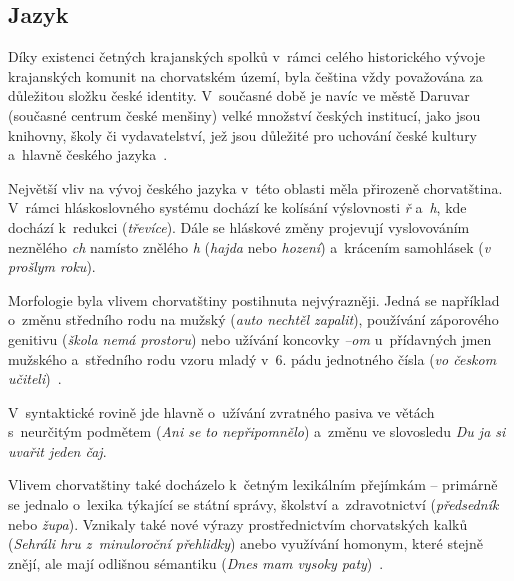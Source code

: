\hypertarget{jazyk-3}{%
\subsection*{Jazyk}\label{jazyk-3}}

Díky existenci četných krajanských spolků v~rámci celého historického vývoje krajanských komunit na chorvatském území, byla čeština vždy považována za důležitou složku české identity. V~současné době je navíc ve městě Daruvar (současné centrum české menšiny) velké množství českých institucí, jako jsou knihovny, školy či vydavatelství, jež jsou důležité pro uchování české kultury a~hlavně českého jazyka~\parencite{Veltruski2018}.

Největší vliv na vývoj českého jazyka v~této oblasti měla přirozeně chorvatština. V~rámci hláskoslovného systému dochází ke kolísání výslovnosti \emph{ř} a~\emph{h}, kde dochází k~redukci (\emph{třevíce}). Dále se hláskové změny projevují vyslovováním neznělého \emph{ch} namísto znělého \emph{h} (\emph{hajda} nebo \emph{hození}) a~krácením samohlásek (\emph{v prošlym roku}).

Morfologie byla vlivem chorvatštiny postihnuta nejvýrazněji. Jedná se například o~změnu středního rodu na mužský (\emph{auto nechtěl zapalit}), používání záporového genitivu (\emph{škola nemá prostoru}) nebo užívání koncovky \emph{--om} u~přídavných jmen mužského a~středního rodu vzoru mladý v~6. pádu jednotného čísla (\emph{vo českom učiteli})~\parencite{Kokaisl2012}.

V~syntaktické rovině jde hlavně o~užívání zvratného pasiva ve větách s~neurčitým podmětem (\emph{Ani se to nepřipomnělo}) a~změnu ve slovosledu \emph{Du ja si uvařit jeden čaj}.

Vlivem chorvatštiny také docházelo k~četným lexikálním přejímkám -- primárně se jednalo o~lexika týkající se státní správy, školství a~zdravotnictví (\emph{předsedník} nebo \emph{župa}). Vznikaly také nové výrazy prostřednictvím chorvatských kalků (\emph{Sehráli hru z~minuloroční přehlidky}) anebo využívání homonym, které stejně znějí, ale mají odlišnou sémantiku (\emph{Dnes mam vysoky paty})~\parencite{Kokaisl2012}.
